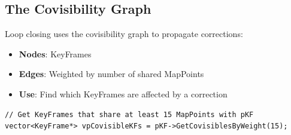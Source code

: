 \subsection{The Covisibility Graph}

Loop closing uses the covisibility graph to propagate corrections:

\begin{itemize}
    \item \textbf{Nodes}: KeyFrames
    \item \textbf{Edges}: Weighted by number of shared MapPoints
    \item \textbf{Use}: Find which KeyFrames are affected by a correction
\end{itemize}

\begin{lstlisting}[caption={Covisibility example}]
// Get KeyFrames that share at least 15 MapPoints with pKF
vector<KeyFrame*> vpCovisibleKFs = pKF->GetCovisiblesByWeight(15);
\end{lstlisting}
